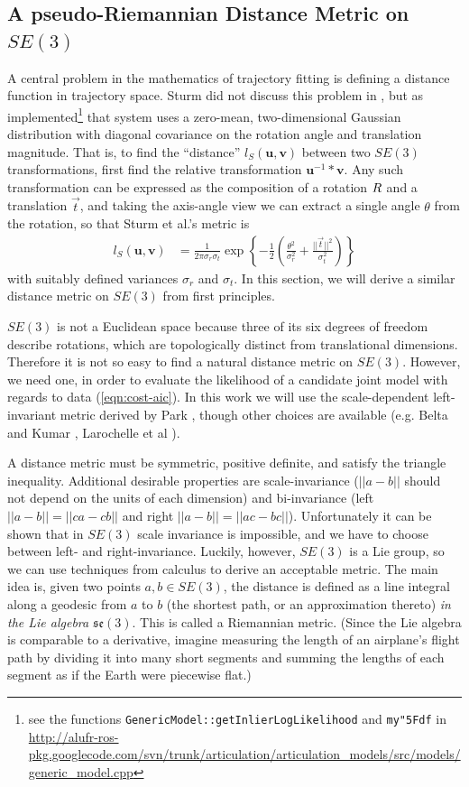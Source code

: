 \documentclass[letterpaper, 10 pt, conference]{ieeeconf}  %
\def\xmat{\uppercase}    \def\xmatstr{in uppercase}
\def\xvec{\vec}          \def\xvecstr{with an arrow}
\def\xse{\bm}            \def\xsestr{in boldface}
\begin{document}
\subsection{A pseudo-Riemannian Distance Metric on $SE(3)$}\label{sec:metric}
A central problem in the mathematics of trajectory fitting is defining a distance function in trajectory space. Sturm did not discuss this problem in \cite{Sturm2011}, but as implemented\footnote{see the functions \texttt{GenericModel::getInlierLogLikelihood} and \texttt{my\char"5Fdf} in \url{http://alufr-ros-pkg.googlecode.com/svn/trunk/articulation/articulation_models/src/models/generic_model.cpp}} that system uses a zero-mean, two-dimensional Gaussian distribution with diagonal covariance on the rotation angle and translation magnitude. That is, to find the ``distance'' $l_S(\xse{u},\xse{v})$ between two $SE(3)$ transformations, first find the relative transformation $\xse{u}^{-1}*\xse{v}$. Any such transformation can be expressed as the composition of a rotation $\xmat{r}$ and a translation $\xvec{t}$, and taking the axis-angle view we can extract a single angle $\theta$ from the rotation, so that Sturm et al.'s metric is
\begin{align}
  l_S(\xse{u},\xse{v}) &= \frac{1}{2\pi \sigma_r \sigma_t} \exp\left\{-\frac{1}{2}\left( \frac{\theta^2}{\sigma_r^2} + \frac{||\xvec{t}||^2}{\sigma_t^2} \right)\right\} \label{eqn:sturm-objective}
\end{align}
with suitably defined variances $\sigma_r$ and $\sigma_t$. In this section, we will derive a similar distance metric on $SE(3)$ from first principles.

$SE(3)$ is not a Euclidean space because three of its six degrees of freedom describe rotations, which are topologically distinct from translational dimensions. Therefore it is not so easy to find a natural distance metric on $SE(3)$. However, we need one, in order to evaluate the likelihood of a candidate joint model with regards to data (\ref{eqn:cost-aic}). In this work we will use the scale-dependent left-invariant metric derived by Park \cite{Park1995}, though other choices are available (e.g. Belta and Kumar \cite{Belta2002}, Larochelle et al \cite{Larochelle2007}).

A distance metric must be symmetric, positive definite, and satisfy the triangle inequality. Additional desirable properties are scale-invariance ($||a-b||$ should not depend on the units of each dimension) and bi-invariance (left $||a-b|| = ||ca-cb||$ and right $||a-b|| = ||ac-bc||$). Unfortunately it can be shown \cite{Park1995} that in $SE(3)$ scale invariance is impossible, and we have to choose between left- and right-invariance. Luckily, however, $SE(3)$ is a Lie group, so we can use techniques from calculus to derive an acceptable metric. The main idea is, given two points $a, b \in SE(3)$, the distance is defined as a line integral along a geodesic from $a$ to $b$ (the shortest path, or an approximation thereto) \emph{in the Lie algebra $\mathfrak{se}(3)$}. This is called a Riemannian metric. (Since the Lie algebra is comparable to a derivative, imagine measuring the length of an airplane's flight path by dividing it into many short segments and summing the lengths of each segment as if the Earth were piecewise flat.)
\end{document}
